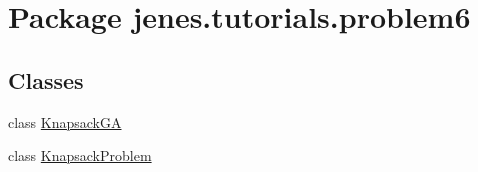 \hypertarget{namespacejenes_1_1tutorials_1_1problem6}{\section{Package jenes.\-tutorials.\-problem6}
\label{namespacejenes_1_1tutorials_1_1problem6}
}
\subsection*{Classes}
\begin{DoxyCompactItemize}
\item 
class \hyperlink{classjenes_1_1tutorials_1_1problem6_1_1_knapsack_g_a}{Knapsack\-G\-A}
\item 
class \hyperlink{classjenes_1_1tutorials_1_1problem6_1_1_knapsack_problem}{Knapsack\-Problem}
\end{DoxyCompactItemize}
